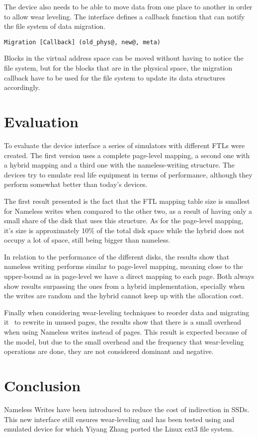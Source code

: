\documentclass[twocolumn,a4paper,10pt]{article}
\begin{document}
The device also needs to be able to move data from one place to another in
order to allow wear leveling. The interface defines a callback function that
can notify the file system of data migration.
\begin{lstlisting}
Migration [Callback] (old_phys@, new@, meta)
\end{lstlisting}

Blocks in the virtual address space can be moved without having to notice the
file system, but for the blocks that are in the physical space, the migration
callback have to be used for the file system to update its data structures
accordingly.

\section*{Evaluation}
To evaluate the device interface a series of simulators with different FTLs
were created. The first version uses a complete page-level mapping, a second
one with a hybrid mapping and a third one with the nameless-writing structure.
The devices try to emulate real life equipment in terms of performance,
although they perform somewhat better than today’s devices.

The first result presented is the fact that the FTL mapping table size is
smallest for Nameless writes when compared to the other two, as a result of
having only a small share of the disk that uses this structure. As for the
page-level mapping, it’s size is approximately 10\% of the total disk space
while the hybrid does not occupy a lot of space, still being bigger than
nameless.

In relation to the performance of the different disks, the results show that
nameless writing performs similar to page-level mapping, meaning close to the
upper-bound as in page-level we have a direct mapping to each page. Both
always show results surpassing the ones from a hybrid implementation,
specially when the writes are random and the hybrid cannot keep up with the
allocation cost.

Finally when considering wear-leveling techniques to reorder data and
migrating it  to rewrite in unused pages, the results show that there is a
small overhead when using Nameless writes instead of pages. This result is
expected because of the model, but due to the small overhead and the frequency
that wear-leveling operations are done, they are not considered dominant and
negative.

\section*{Conclusion}
Nameless Writes have been introduced to reduce the cost of indirection in
SSDs. This new interface still ensures wear-leveling and has been tested using
and emulated device for which Yiyang Zhang ported the Linux ext3 file system.
\end{document}
